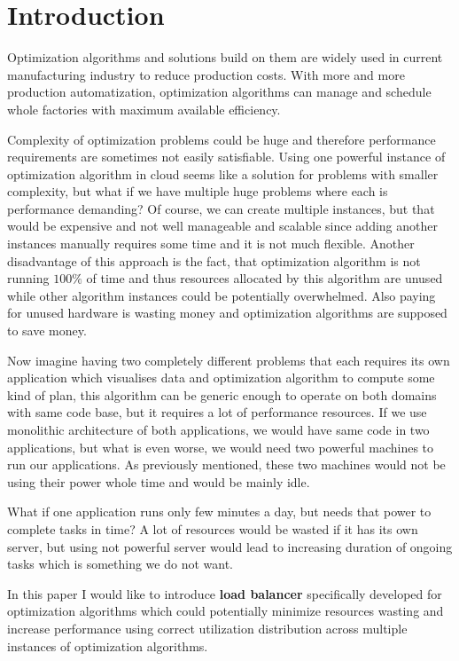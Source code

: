
\chapter{Introduction}\label{ch:introduction}
Optimization algorithms and solutions build on them are widely used in current manufacturing industry to reduce production costs.
With more and more production automatization, optimization algorithms can manage and schedule whole factories with maximum available efficiency.

Complexity of optimization problems could be huge and therefore performance requirements are sometimes not easily satisfiable.
Using one powerful instance of optimization algorithm in cloud seems like a solution for problems with smaller complexity,
but what if we have multiple huge problems where each is performance demanding?
Of course, we can create multiple instances, but that would be expensive and not well manageable and scalable
since adding another instances manually requires some time and it is not much flexible.
Another disadvantage of this approach is the fact, that optimization algorithm is not running $100\%$ of time
and thus resources allocated by this algorithm are unused while other algorithm instances could be potentially overwhelmed.
Also paying for unused hardware is wasting money and optimization algorithms are supposed to save money.

Now imagine having two completely different problems that each requires its own application which visualises data
and optimization algorithm to compute some kind of plan,
this algorithm can be generic enough to operate on both domains with same code base, but it requires a lot of performance resources.
If we use monolithic architecture of both applications,
we would have same code in two applications,
but what is even worse, we would need two powerful machines to run our applications.
As previously mentioned, these two machines would not be using their power whole time and would be mainly idle.

What if one application runs only few minutes a day, but needs that power to complete tasks in time?
A lot of resources would be wasted if it has its own server,
but using not powerful server would lead to increasing duration of ongoing tasks which is something we do not want.

In this paper I would like to introduce \textbf{load balancer} specifically developed for optimization algorithms
which could potentially minimize resources wasting and increase performance using correct utilization distribution across
multiple instances of optimization algorithms.






